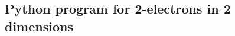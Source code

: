 \documentclass[%
oneside,                 %
final,                   %
10pt]{article}
\begin{document}
\subsection{Python program for 2-electrons in 2 dimensions}
\end{document}
